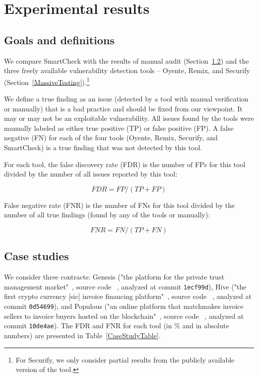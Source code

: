 \section{Experimental results} \label{SectionResults}

\subsection{Goals and definitions}

We compare SmartCheck with the results of manual audit (Section~\ref{ManualAudit}) and the three freely available vulnerability detection tools -- Oyente, Remix, and Securify (Section~\ref{MassiveTesting}).\footnote{For Securify, we only consider partial results from the publicly available version of the tool.}

We define a true finding as an issue (detected by a tool with manual verification or manually) that is a bad practice and should be fixed from our viewpoint.
It may or may not be an exploitable vulnerability.
All issues found by the tools were manually labeled as either true positive (TP) or false positive (FP).
A false negative (FN) for each of the four tools (Oyente, Remix, Securify, and SmartCheck) is a true finding that was not detected by this tool.

For each tool, the false discovery rate (FDR) is the number of FPs for this tool divided by the number of all issues reported by this tool:

\[FDR = FP / (TP + FP)\]

False negative rate (FNR) is the number of FNs for this tool divided by the number of all true findings (found by any of the tools or manually):

\[FNR = FN / (TP + FN)\]


\subsection{Case studies} \label{ManualAudit}

We consider three contracts: Genesis ("the platform for the private trust management market"~\cite{Genesis}, source code ~\cite{GenesisGithub}, analyzed at commit \texttt{1ecf99d}), Hive ("the first crypto currency [sic] invoice financing platform"~\cite{Hive}, source code ~\cite{HiveGithub}, analyzed at commit \texttt{0d54699}), and Populous ("an online platform that matchmakes invoice sellers to invoice buyers hosted on the blockchain"~\cite{Populous}, source code ~\cite{PopulousGithub}, analyzed at commit \texttt{10de4ae}).
The FDR and FNR for each tool (in \% and in absolute numbers) are presented in Table~\ref{CaseStudyTable}.

